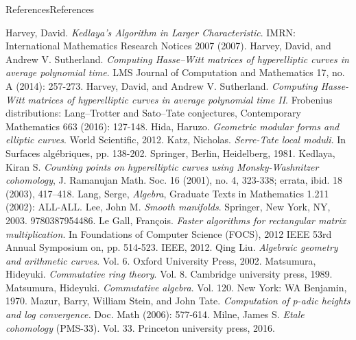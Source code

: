 \documentclass[10pt,]{book}
\numberwithin{equation}{section}
\begin{document}
\begin{references-chapter-numberless}{References}{}{References}{}{}
\begin{thebibliography}{9}
\hypertarget{bib-harvey-sqrtp}{}Harvey, David. \textit{Kedlaya's Algorithm in Larger Characteristic}. IMRN: International Mathematics Research Notices 2007 (2007).
\hypertarget{bib-harvey-sutherland}{}Harvey, David, and Andrew V. Sutherland. \textit{Computing Hasse–Witt matrices of hyperelliptic curves in average polynomial time}. LMS Journal of Computation and Mathematics 17, no. A (2014): 257-273.
\hypertarget{bib-harvey-sutherland-ii}{}Harvey, David, and Andrew V. Sutherland. \textit{Computing Hasse-Witt matrices of hyperelliptic curves in average polynomial time II}. Frobenius distributions: Lang–Trotter and Sato–Tate conjectures, Contemporary Mathematics 663 (2016): 127-148.
\hypertarget{bib-hida-geometric}{}Hida, Haruzo. \textit{Geometric modular forms and elliptic curves}. World Scientific, 2012.
\hypertarget{bib-katz-serre-tate}{}Katz, Nicholas. \textit{Serre-Tate local moduli}. In Surfaces algébriques, pp. 138-202. Springer, Berlin, Heidelberg, 1981.
\hypertarget{bib-kedlaya-counting}{}Kedlaya, Kiran S. \textit{Counting points on hyperelliptic curves using Monsky-Washnitzer cohomology}, J. Ramanujan Math. Soc. 16 (2001), no. 4, 323-338; errata, ibid. 18 (2003), 417--418.
\hypertarget{bib-lang-algebra}{}Lang, Serge,  \textit{Algebra}, Graduate Texts in Mathematics 1.211 (2002): ALL-ALL.
\hypertarget{bib-lee-smooth}{}Lee, John M. \textit{Smooth manifolds}. Springer, New York, NY, 2003. 9780387954486.
\hypertarget{bib-le-gall}{}Le Gall, François. \textit{Faster algorithms for rectangular matrix multiplication}. In Foundations of Computer Science (FOCS), 2012 IEEE 53rd Annual Symposium on, pp. 514-523. IEEE, 2012.
\hypertarget{bib-liu}{}Qing Liu. \textit{Algebraic geometry and arithmetic curves}. Vol. 6. Oxford University Press, 2002.
\hypertarget{bib-matsumura}{}Matsumura, Hideyuki. \textit{Commutative ring theory}. Vol. 8. Cambridge university press, 1989.
\hypertarget{bib-matsumura-algebra}{}Matsumura, Hideyuki. \textit{Commutative algebra}. Vol. 120. New York: WA Benjamin, 1970.
\hypertarget{bib-mazur-stein-tate}{}Mazur, Barry, William Stein, and John Tate. \textit{Computation of p-adic heights and log convergence.} Doc. Math (2006): 577-614.
\hypertarget{bib-milne-etale}{}Milne, James S. \textit{Etale cohomology} (PMS-33). Vol. 33. Princeton university press, 2016.

\end{thebibliography}
\end{references-chapter-numberless}
\end{document}
